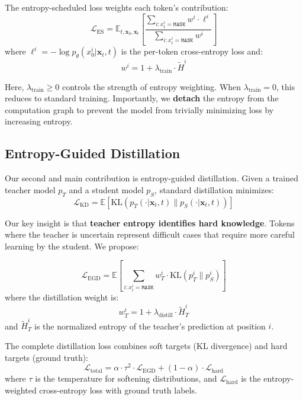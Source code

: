 \documentclass[conference]{IEEEtran}
\begin{document}
The entropy-scheduled loss weights each token's contribution:
\begin{equation}
    \mathcal{L}_{\text{ES}} = \mathbb{E}_{t, \mathbf{x}_0, \mathbf{x}_t} \left[ \frac{\sum_{i: x_t^i = \texttt{MASK}} w^i \cdot \ell^i}{\sum_{i: x_t^i = \texttt{MASK}} w^i} \right]
\end{equation}
where $\ell^i = -\log p_\theta(x_0^i | \mathbf{x}_t, t)$ is the per-token cross-entropy loss and:
\begin{equation}
    w^i = 1 + \lambda_{\text{train}} \cdot \tilde{H}^i
\end{equation}

Here, $\lambda_{\text{train}} \geq 0$ controls the strength of entropy weighting. When $\lambda_{\text{train}} = 0$, this reduces to standard training. Importantly, we \textbf{detach} the entropy from the computation graph to prevent the model from trivially minimizing loss by increasing entropy.

\subsection{Entropy-Guided Distillation}

Our second and main contribution is entropy-guided distillation. Given a trained teacher model $p_T$ and a student model $p_S$, standard distillation minimizes:
\begin{equation}
    \mathcal{L}_{\text{KD}} = \mathbb{E} \left[ \text{KL}(p_T(\cdot | \mathbf{x}_t, t) \| p_S(\cdot | \mathbf{x}_t, t)) \right]
\end{equation}

Our key insight is that \textbf{teacher entropy identifies hard knowledge}. Tokens where the teacher is uncertain represent difficult cases that require more careful learning by the student. We propose:

\begin{equation}
    \mathcal{L}_{\text{EGD}} = \mathbb{E} \left[ \sum_{i: x_t^i = \texttt{MASK}} w_T^i \cdot \text{KL}(p_T^i \| p_S^i) \right]
\end{equation}
where the distillation weight is:
\begin{equation}
    w_T^i = 1 + \lambda_{\text{distill}} \cdot \tilde{H}_T^i
\end{equation}
and $\tilde{H}_T^i$ is the normalized entropy of the teacher's prediction at position $i$.

The complete distillation loss combines soft targets (KL divergence) and hard targets (ground truth):
\begin{equation}
    \mathcal{L}_{\text{total}} = \alpha \cdot \tau^2 \cdot \mathcal{L}_{\text{EGD}} + (1-\alpha) \cdot \mathcal{L}_{\text{hard}}
\end{equation}
where $\tau$ is the temperature for softening distributions, and $\mathcal{L}_{\text{hard}}$ is the entropy-weighted cross-entropy loss with ground truth labels.
\end{document}
